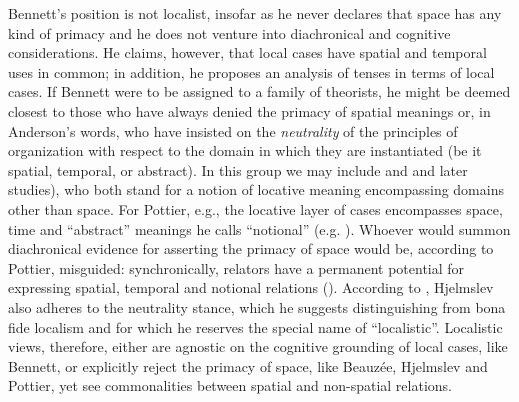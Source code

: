 \documentclass[english,output=paper,colorlinks,citecolor=brown]{../langscibook}
\begin{document}
Bennett’s position is not localist, insofar as he never declares that space has any kind of primacy and he does not venture into diachronical and cognitive considerations. He claims, however, that local cases have spatial and temporal uses in common; in addition, he proposes an analysis of tenses in terms of local cases. If Bennett were to be assigned to a family of theorists, he might be deemed closest to those who have always denied the primacy of spatial meanings or, in Anderson’s words, who have insisted on the \textit{neutrality} of the principles of organization with respect to the domain in which they are instantiated (be it spatial, temporal, or abstract). In this group we may include \citealt{Beauzée1786} and \citealt{Pottier1962} and later studies), who both stand for a notion of locative meaning encompassing domains other than space. For Pottier, e.g., the locative layer of cases encompasses space, time and “abstract” meanings he calls “notional” (e.g. \citealt[53--55]{Pottier1974}). Whoever would summon diachronical evidence for asserting the primacy of space would be, according to Pottier, misguided: synchronically, relators have a permanent potential for expressing spatial, temporal and notional relations (\citealt[126]{Pottier1962}). According to \citet{Anderson1971, Anderson1994}, Hjelmslev also adheres to the neutrality stance, which he suggests distinguishing from bona fide localism and for which he reserves the special name of “localistic”. Localistic views, therefore, either are agnostic on the cognitive grounding of local cases, like Bennett, or explicitly reject the primacy of space, like Beauzée, Hjelmslev and Pottier, yet see commonalities between spatial and non-spatial relations.
\end{document}
